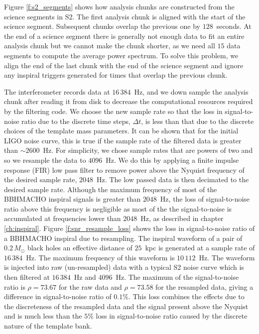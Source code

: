 Figure \ref{f:s2_segments} shows how analysis chunks are constructed from the
science segments in S2. The first analysis chunk is aligned with the start of
the science segment. Subsequent chunks overlap the previous one by
$128$~seconds. At the end of a science segment there is generally not enough
data to fit an entire analysis chunk but we cannot make the chunk shorter, as
we need all $15$ data segments to compute the average power spectrum. To solve
this problem, we align the end of the last chunk with the end of the science
segment and ignore any inspiral triggers generated for times that overlap the
previous chunk. 

The interferometer records data at $16\,384$~Hz, and we down sample the
analysis chunk after reading it from disk to decrease the computational
resources required by the filtering code. We choose the new sample rate so
that the loss in signal-to-noise ratio due to the discrete time steps, 
$\Delta t$, is less than that due to the discrete choices of the template mass
parameters. It can be shown that for the initial LIGO noise curve, this is
true if the sample rate of the filtered data is greater than $\sim
2600$~Hz\cite{Owen:1998dk}. For simplicity, we chose sample rates that are
powers of two and so we resample the data to $4096$~Hz.  We do this by
applying a finite impulse response (FIR) low pass filter to remove power above
the Nyquist frequency of the desired sample rate, $2048$~Hz. The low passed
data is then decimated to the desired sample rate. Although the maximum
frequency of most of the BBHMACHO inspiral signals is greater than $2048$~Hz,
the loss of signal-to-noise ratio above this frequency is negligible as most
of the the signal-to-noise is accumulated at frequencies lower than $2048$~Hz,
as described in chapter \ref{ch:inspiral}. Figure \ref{f:snr_resample_loss} shows
the loss in signal-to-noise ratio of a BBHMACHO inspiral due to resampling.
The inspiral waveform of a pair of $0.2\,M_\odot$ black holes an effective
distance of $25$~kpc is generated at a sample rate of $16\,384$~Hz. The
maximum frequency of this waveform is $10\,112$~Hz. The waveform is injected
into raw (un-resampled) data with a typical S2 noise curve which is then
filtered at $16\,384$~Hz and $4096$~Hz. The maximum of the signal-to-noise
ratio is $\rho = 73.67$ for the raw data and $\rho = 73.58$ for the resampled
data, giving a difference in signal-to-noise ratio of $0.1\%$. This loss
combines the effects due to the discreteness of the resampled data and the
signal present above the Nyquist and is much less than the $5\%$ loss in
signal-to-noise ratio caused by the discrete nature of the template bank.

